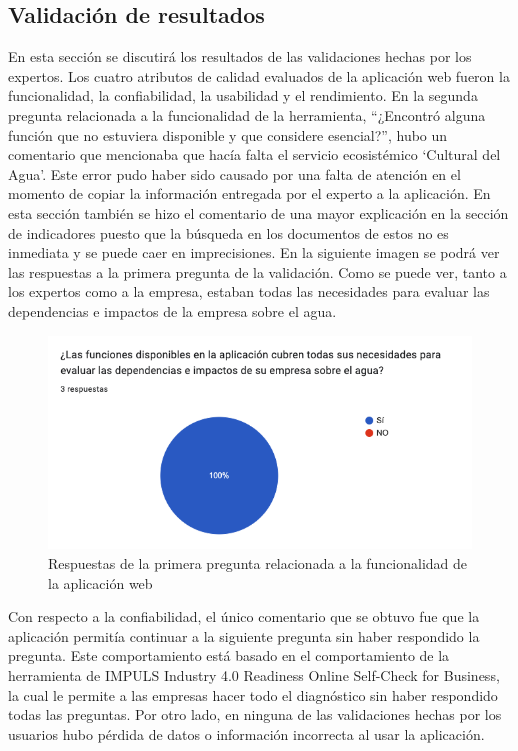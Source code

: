 \subsection{Validación de resultados}
En esta sección se discutirá los resultados de las validaciones hechas por los expertos. Los cuatro atributos de calidad evaluados de la aplicación web fueron la funcionalidad, la confiabilidad, la usabilidad y el rendimiento. En la segunda pregunta relacionada a la funcionalidad de la herramienta, “¿Encontró alguna función que no estuviera disponible y que considere esencial?”, hubo un comentario que mencionaba que hacía falta el servicio ecosistémico ‘Cultural del Agua’. Este error pudo haber sido causado por una falta de atención en el momento de copiar la información entregada por el experto a la aplicación.  En esta sección también se hizo el comentario de una mayor explicación en la sección de indicadores puesto que la búsqueda en los documentos de estos no es inmediata y se puede caer en imprecisiones. En la siguiente imagen se podrá ver las respuestas a la primera pregunta de la validación. Como se puede ver, tanto a los expertos como a la empresa, estaban todas las necesidades para evaluar las dependencias e impactos de la empresa sobre el agua.

\begin{figure}[H]
        \centering
        \includegraphics[scale=0.45]{images/6-validacion/1-funcionalidad.png}
        \caption{Respuestas de la primera pregunta relacionada a la funcionalidad de la aplicación web}
 \end{figure}

Con respecto a la confiabilidad, el único comentario que se obtuvo fue que la aplicación permitía continuar a la siguiente pregunta sin haber respondido la pregunta. Este comportamiento está basado en el comportamiento de la herramienta de IMPULS Industry 4.0 Readiness Online Self-Check for Business, la cual le permite a las empresas hacer todo el diagnóstico sin haber respondido todas las preguntas. Por otro lado, en ninguna de las validaciones hechas por los usuarios hubo pérdida de datos o información incorrecta al usar la aplicación.

